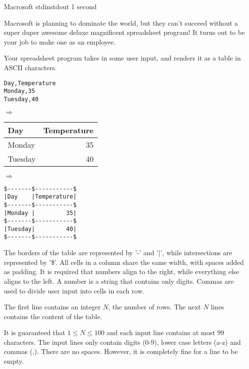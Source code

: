\begin{problem}{Macrosoft}
{stdin}{stdout}
{1 second}{}{}

Macrosoft is planning to dominate the world, but they can't succeed without 
a super duper awesome deluxe magnificent spreadsheet program! It turns out to be your job to
make one as an employee. 

Your spreadsheet program takes in some user input, and renders it as a table in ASCII characters. 
\begin{center}
    \begin{minipage}{1.2in}
\begin{verbatim}
Day,Temperature
Monday,35
Tuesday,40
\end{verbatim}
    \end{minipage}
    $\Longrightarrow$    
    \begin{tabular}{ | l | r | }
        \hline
        Day & Temperature \\
        \hline
        Monday & 35 \\
        \hline
        Tuesday & 40 \\
        \hline
    \end{tabular} $\Longrightarrow$
        \begin{minipage}{2in} 
\begin{verbatim}
$-------$-----------$
|Day    |Temperature|
$-------$-----------$
|Monday |         35|
$-------$-----------$
|Tuesday|         40|
$-------$-----------$
\end{verbatim} 
        \end{minipage}
\end{center}
The borders of the table are represented by '-' and '|', while intersections are represented by '\$'. All cells in a column share the same width, with spaces added as padding. It is required that numbers align to the right, while everything else aligns to the left. A number is a string that contains only digits. Commas are used to divide user input into cells in each row. 

\InputFile

The first line contains an integer $N$, the number of rows.
The next $N$ lines contains the content of the table. 

It is guaranteed that $1 \leq N \leq 100$ and each input line contains at most $99$ characters. 
The input lines only contain digits (0-9), lower case letters (a-z) and commas (,). There are no spaces. However, it is completely fine for a line to be empty.


\end{problem}
